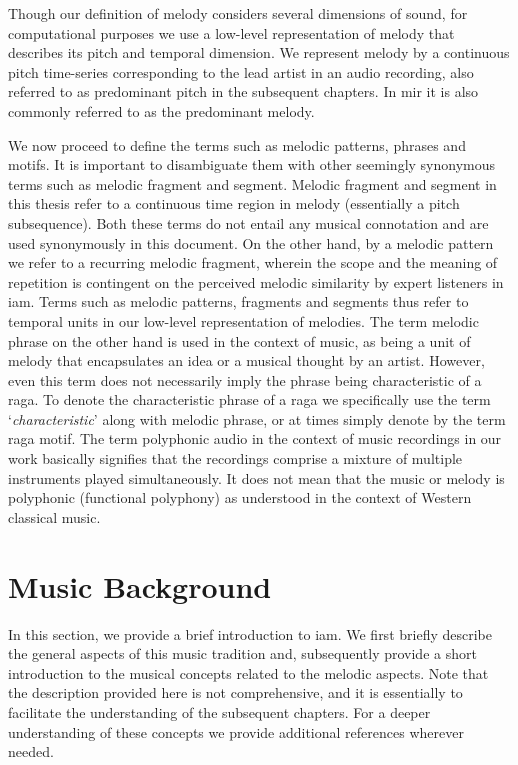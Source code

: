 Though our definition of melody considers several dimensions of sound, for computational purposes we use a low-level representation of melody that describes its pitch and temporal dimension. We represent melody by a continuous pitch time-series corresponding to the lead artist in an audio recording, also referred to as predominant pitch in the subsequent chapters. In \gls{mir} it is also commonly referred to as the predominant melody. 

We now proceed to define the terms such as melodic patterns, phrases and motifs. It is important to disambiguate them with other seemingly synonymous terms such as melodic fragment and segment. Melodic fragment and segment in this thesis refer to a continuous time region in melody (essentially a pitch subsequence). Both these terms do not entail any musical connotation and are used synonymously in this document. On the other hand, by a melodic pattern we refer to a recurring melodic fragment, wherein the scope and the meaning of repetition is contingent on the perceived melodic similarity by expert listeners in \gls{iam}.  Terms such as melodic patterns, fragments and segments thus refer to temporal units in our low-level representation of melodies. The term melodic phrase on the other hand is used in the context of music, as being a unit of melody that encapsulates an idea or a musical thought by an artist. However, even this term does not necessarily imply the phrase being characteristic of a \gls{raga}. To denote the characteristic phrase of a \gls{raga} we specifically use the term `\textit{characteristic}' along with melodic phrase, or at times simply denote by the term \gls{raga} motif. The term polyphonic audio in the context of music recordings in our work basically signifies that the recordings comprise a mixture of multiple instruments played simultaneously. It does not mean that the music or melody is polyphonic (functional polyphony) as understood in the context of Western classical music.

\section{Music Background}
\label{sec:music_background}

In this section, we provide a brief introduction to \gls{iam}. We first briefly describe the general aspects of this  music tradition and, subsequently provide a short introduction to the musical concepts related to the melodic aspects. Note that the description provided here is not comprehensive, and it is essentially to facilitate the understanding of the subsequent chapters. For a deeper understanding of these concepts we provide additional references wherever needed. 

